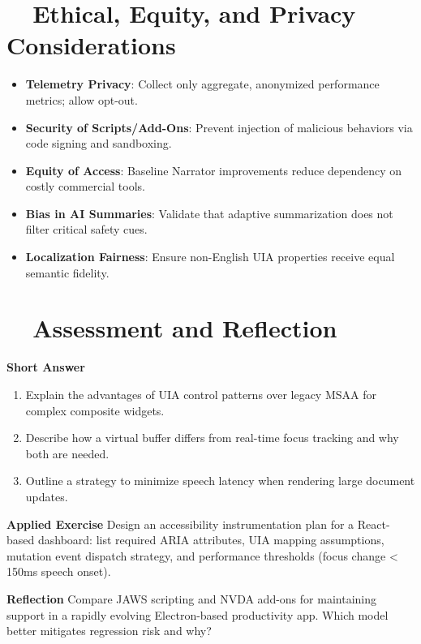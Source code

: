 \section{~~Ethical, Equity, and Privacy Considerations}
\label{sec:sr-ethics}
\begin{itemize}
	\item \textbf{Telemetry Privacy}: Collect only aggregate, anonymized performance metrics; allow opt-out.
	\item \textbf{Security of Scripts/Add-Ons}: Prevent injection of malicious behaviors via code signing and sandboxing.
	\item \textbf{Equity of Access}: Baseline Narrator improvements reduce dependency on costly commercial tools.
	\item \textbf{Bias in AI Summaries}: Validate that adaptive summarization does not filter critical safety cues.
	\item \textbf{Localization Fairness}: Ensure non-English UIA properties receive equal semantic fidelity.
\end{itemize}

\section{~~Assessment and Reflection}
\label{sec:sr-assessment}
\textbf{Short Answer}
\begin{enumerate}
	\item Explain the advantages of UIA control patterns over legacy MSAA for complex composite widgets.
	\item Describe how a virtual buffer differs from real-time focus tracking and why both are needed.
	\item Outline a strategy to minimize speech latency when rendering large document updates.
\end{enumerate}

\textbf{Applied Exercise} Design an accessibility instrumentation plan for a React-based dashboard: list required ARIA attributes, UIA mapping assumptions, mutation event dispatch strategy, and performance thresholds (focus change < 150ms speech onset).

\textbf{Reflection} Compare JAWS scripting and NVDA add-ons for maintaining support in a rapidly evolving Electron-based productivity app. Which model better mitigates regression risk and why?


